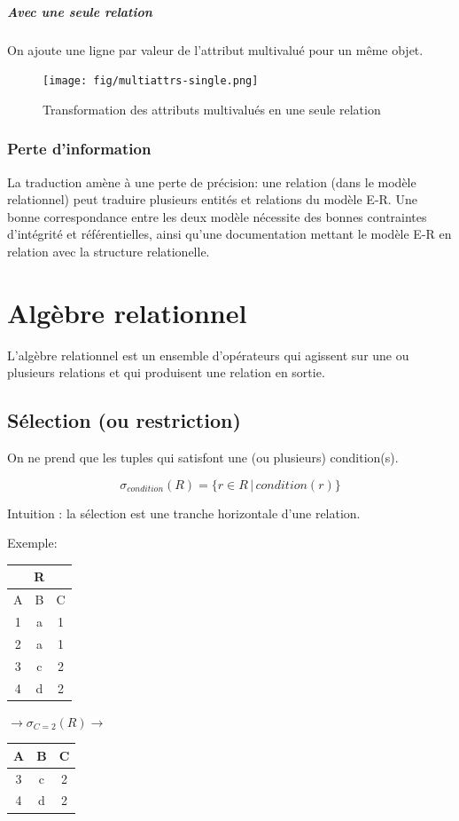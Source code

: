 \documentclass[a4paper]{article}
\begin{document}
\subparagraph{Avec une seule relation}
On ajoute une ligne par valeur de l'attribut multivalué pour un même objet.
\begin{figure}[H]
    \center
    \texttt{[image: fig/multiattrs-single.png]}
    \caption{Transformation des attributs multivalués en une seule relation}
\end{figure}

\subsubsection{Perte d'information}
La traduction amène à une perte de précision: une relation (dans le modèle relationnel)
peut traduire plusieurs entités et relations du modèle E-R. Une bonne correspondance
entre les deux modèle nécessite des bonnes contraintes d'intégrité et référentielles,
ainsi qu'une documentation mettant le modèle E-R en relation avec la structure relationelle.



\section{Algèbre relationnel}

L'algèbre relationnel est un ensemble d'opérateurs qui agissent sur une ou plusieurs
relations et qui produisent une relation en sortie.

  \subsection{Sélection (ou restriction)}
  On ne prend que les tuples qui satisfont une (ou plusieurs) condition(s).

    $$ \sigma_{condition}(R) = \{r\in R\, |\, condition(r)\} $$

  Intuition : la sélection est une tranche horizontale d'une relation.
  
  Exemple:
  \begin{tabular}{|c|c|c|}
	\multicolumn{3}{c}{R}\\
	\hline
	A & B & C\\
	\hline\hline
	1 & a & 1\\
	2 & a & 1\\
	3 & c & 2\\
	4 & d & 2\\
	\hline
  \end{tabular}
  $\rightarrow \sigma_{C=2}(R) \rightarrow$
  \begin{tabular}{|c|c|c|}
	\hline
	A & B & C\\
	\hline\hline
	3 & c & 2\\
	4 & d & 2\\
	\hline
  \end{tabular}
\end{document}
